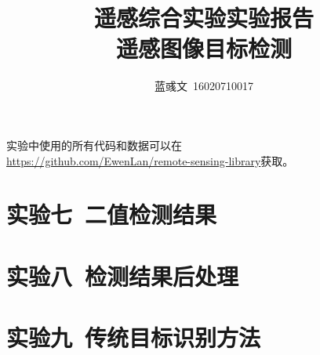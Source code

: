 \documentclass[hyperref, UTF8]{ctexart}
\title{遥感综合实验实验报告\\遥感图像目标检测}
\author{蓝彧文~16020710017}
\begin{document}
	\maketitle
	\tableofcontents
	\newpage
	实验中使用的所有代码和数据可以在\\ \url{https://github.com/EwenLan/remote-sensing-library}获取。
	\section{实验七~二值检测结果}
	
	\section{实验八~检测结果后处理}
	
	\section{实验九~传统目标识别方法}
	
\end{document}
